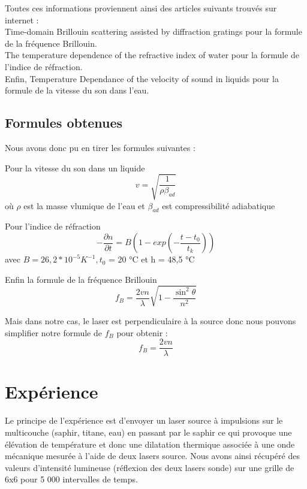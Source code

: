 \documentclass{rapportECC}
\begin{document}
Toutes ces informations proviennent ainsi des articles suivants trouvés sur internet :\\

Time-domain Brillouin scattering assisted by diffraction gratings pour la formule de la fréquence Brillouin.\\
The temperature dependence of the refractive index of water pour la formule de l'indice de réfraction.\\
Enfin, Temperature Dependance of the velocity of sound in liquids pour la formule de la vitesse du son dans l'eau.



\subsection{Formules obtenues}

Nous avons donc pu en tirer les formules suivantes :

Pour la vitesse du son dans un liquide
\begin{equation}
    v = \sqrt{\frac{1}{\rho \beta_{ad}}}
\end{equation}
où $\rho$ est la masse vlumique de l'eau et $\beta_{ad}$ est compressibilité adiabatique

Pour l'indice de réfraction 
\begin{equation}
    -\frac{\partial n}{\partial t} = B(1-exp(-\frac{t-t_0}{t_k}))
\end{equation}
avec $B=26,2*10^{-5} K^{-1}, t_0$ = 20 °C et h = 48,5 °C

Enfin la formule de la fréquence Brillouin
\begin{equation}
    f_B = \frac{2vn}{\lambda}\sqrt{1-\frac{\sin^2{\theta}}{n^2}}
\end{equation}

Mais dans notre cas, le laser est perpendiculaire à la source donc nous pouvons simplifier notre formule de $f_B$ pour obtenir :
\begin{equation}
    f_B =  \frac{2vn}{\lambda}
\end{equation}

\section{Expérience}

Le principe de l'expérience est d'envoyer un laser source à impulsions sur le multicouche (saphir, titane, eau) en passant par le saphir ce qui provoque une élévation de température et donc une dilatation thermique associée à une onde mécanique mesurée à l'aide de deux lasers source. Nous avons ainsi récupéré des valeurs d'intensité lumineuse (réflexion des deux lasers sonde) sur une grille de 6x6 pour 5 000 intervalles de temps.
\end{document}
